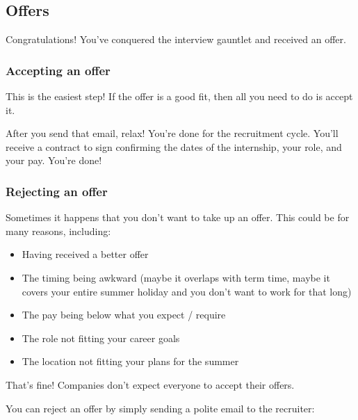 \subsection{Offers}

Congratulations! You've conquered the interview gauntlet and received an offer. 

\subsubsection{Accepting an offer}

This is the easiest step! If the offer is a good fit, then all you need to do is accept it. 


After you send that email, relax! You're done for the recruitment cycle. You'll receive a contract to sign confirming the dates of the internship, your role, and your pay. You're done! 

\subsubsection{Rejecting an offer}

Sometimes it happens that you don't want to take up an offer. This could be for many reasons, including:
\begin{itemize}
\item Having received a better offer
\item The timing being awkward (maybe it overlaps with term time, maybe it covers your entire summer holiday and you don't want to work for that long)
\item The pay being below what you expect / require
\item The role not fitting your career goals
\item The location not fitting your plans for the summer
\end{itemize}

That's fine! Companies don't expect everyone to accept their offers. 

You can reject an offer by simply sending a polite email to the recruiter:



